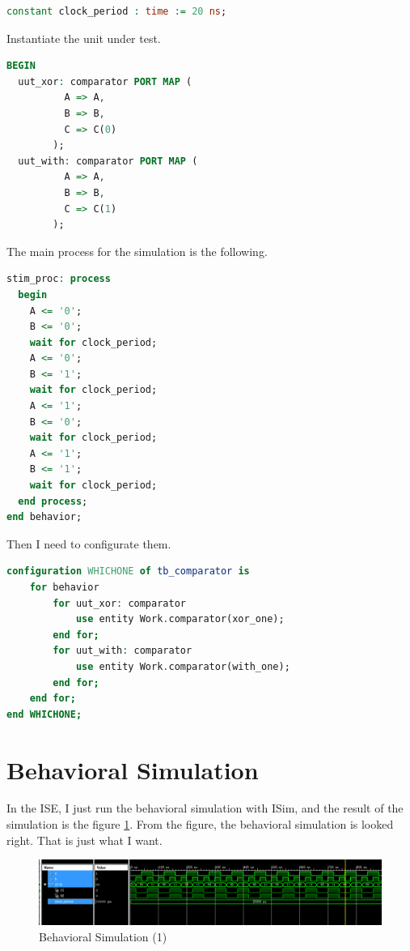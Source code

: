 \documentclass{article}
\begin{document}
\begin{lstlisting}[language=VHDL]
  constant clock_period : time := 20 ns;
\end{lstlisting}

   Instantiate the unit under test.

\begin{lstlisting}[language=VHDL]
BEGIN
  uut_xor: comparator PORT MAP (
          A => A,
          B => B,
          C => C(0)
        );
  uut_with: comparator PORT MAP (
          A => A,
          B => B,
          C => C(1)
        );
\end{lstlisting}

   The main process for the simulation is the following.

\begin{lstlisting}[language=VHDL]
  stim_proc: process
  begin		
	A <= '0';
	B <= '0';
	wait for clock_period;
	A <= '0';
	B <= '1';
	wait for clock_period;
	A <= '1';
	B <= '0';
	wait for clock_period;
	A <= '1';
	B <= '1';
	wait for clock_period;
  end process;
end behavior;
\end{lstlisting}

   Then I need to configurate them.

\begin{lstlisting}[language=VHDL]
configuration WHICHONE of tb_comparator is
	for behavior
		for uut_xor: comparator
			use entity Work.comparator(xor_one);
		end for;
		for uut_with: comparator
			use entity Work.comparator(with_one);
		end for;
	end for;
end WHICHONE;
\end{lstlisting}




    \section{Behavioral Simulation}
    \label{sec:behavioralsimulation}
    
    In the ISE, I just run the behavioral simulation with ISim, and the result of the simulation
    is the figure \ref{fig:homework4-1}. From the figure, the behavioral simulation is looked right.
    That is just what I want.

\begin{figure}[h!]
\centering
\includegraphics[width=1\linewidth]{homework4-1}
\caption{Behavioral Simulation (1)}
\label{fig:homework4-1}
\end{figure}
\end{document}
